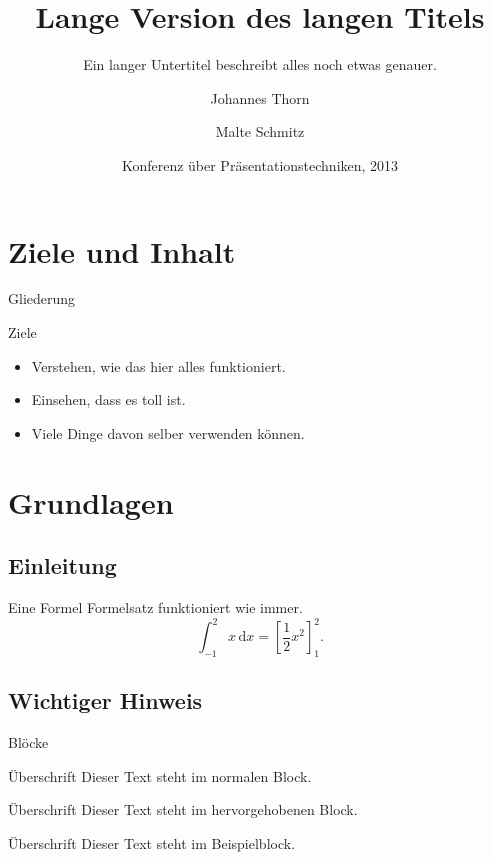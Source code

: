 \documentclass{beamer}
\title[Kurztitel]{%
  Lange Version des langen Titels}
\subtitle{Ein langer Untertitel beschreibt
  alles noch etwas genauer.}
\author[Thorn, Schmitz]{%
  Johannes Thorn \and Malte Schmitz}
\date[KPT 2013]{Konferenz über
  Präsentationstechniken, 2013}
\begin{document}
\begin{frame}
  \maketitle
\end{frame}

\section*{Ziele und Inhalt}

\begin{frame}{Gliederung}
  \tableofcontents
\end{frame}

\begin{frame}{Ziele}
  \begin{itemize}
    \item Verstehen, wie das hier alles funktioniert.
    \item Einsehen, dass es toll ist.
    \item Viele Dinge davon selber verwenden können.
  \end{itemize}
\end{frame}

\section{Grundlagen}

\subsection{Einleitung}

\begin{frame}{Eine Formel}
  Formelsatz funktioniert wie immer.
  \[ \int_{-1}^{2} x\,\mathrm{d}x = \left[
  \frac{1}{2}x^{2} \right]_{1}^{2}. \]
\end{frame}

\subsection{Wichtiger Hinweis}

\begin{frame}{Blöcke}
  \begin{block}{Überschrift}
    Dieser Text steht im normalen Block.
  \end{block}

  \begin{alertblock}{Überschrift}
    Dieser Text steht im hervorgehobenen Block.
  \end{alertblock}

  \begin{exampleblock}{Überschrift}
    Dieser Text steht im Beispielblock.
  \end{exampleblock}
\end{frame}
\end{document}
